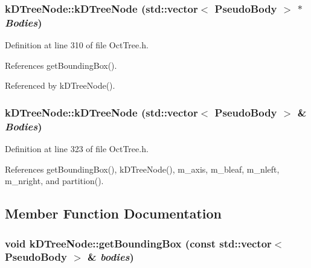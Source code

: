 \subsubsection[{kDTreeNode}]{\setlength{\rightskip}{0pt plus 5cm}kDTreeNode::kDTreeNode (std::vector$<$ {\bf PseudoBody} $>$ $\ast$ {\em Bodies})}\label{classkDTreeNode_a9e4e0d3ada0dd2672cfc4fda7dae104f}


Definition at line 310 of file OctTree.h.



References getBoundingBox().



Referenced by kDTreeNode().

\subsubsection[{kDTreeNode}]{\setlength{\rightskip}{0pt plus 5cm}kDTreeNode::kDTreeNode (std::vector$<$ {\bf PseudoBody} $>$ \& {\em Bodies})}\label{classkDTreeNode_a6a6c9d567a3f17d080b6ba020ca4eb57}


Definition at line 323 of file OctTree.h.



References getBoundingBox(), kDTreeNode(), m\_\-axis, m\_\-bleaf, m\_\-nleft, m\_\-nright, and partition().



\subsection{Member Function Documentation}
\subsubsection[{getBoundingBox}]{\setlength{\rightskip}{0pt plus 5cm}void kDTreeNode::getBoundingBox (const std::vector$<$ {\bf PseudoBody} $>$ \& {\em bodies})}\label{classkDTreeNode_ae7a307cd022026795d9a0b1edd0aeeaf}


